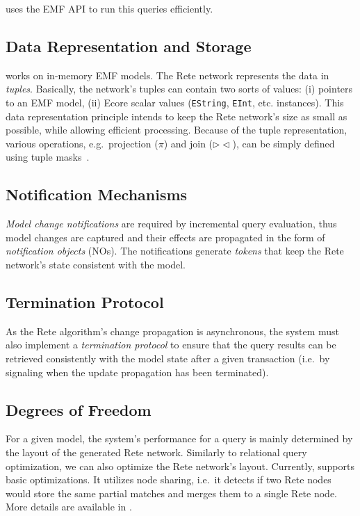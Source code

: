 \eiq{} uses the EMF API to run this queries efficiently.

\subsection{Data Representation and Storage}

\eiq{} works on in-memory EMF models. The Rete network represents the data in \emph{tuples}. Basically, the network's tuples can contain two sorts of values: (i) pointers to an EMF model, (ii) Ecore scalar values (\verb+EString+, \verb+EInt+, etc. instances). This data representation principle intends to keep the Rete network's size as small as possible, while allowing efficient processing. Because of the tuple representation, various operations, e.g.\ projection ($ \pi $) and join ($ \rhd\!\!\lhd $), can be simply defined using tuple masks~\cite{BergmannMasters}.

\subsection{Notification Mechanisms}
\label{notifications}

\emph{Model change notifications} are required by incremental query evaluation, thus model changes are captured and their effects are propagated in the form of \emph{notification objects} (NOs). The notifications generate \emph{tokens} that keep the Rete network's state consistent with the model. 

\subsection{Termination Protocol}

As the Rete algorithm's change propagation is asynchronous, the system must also implement a \emph{termination protocol} to ensure that the query results can be retrieved consistently with the model state after a given transaction (i.e.\ by signaling when the update propagation has been terminated).

\subsection{Degrees of Freedom}

For a given model, the system's performance for a query is mainly determined by the layout of the generated Rete network. Similarly to relational query optimization, we can also optimize the Rete network's layout. Currently, \eiq{} supports basic optimizations. It utilizes node sharing, i.e.\ it detects if two Rete nodes would store the same partial matches and merges them to a single Rete node. More details are available in \cite{BergmannPhD}.

